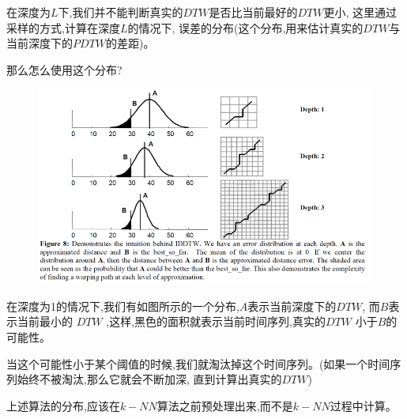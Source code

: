 \documentclass[UTF8,a4paper]{ctexart}
\newcommand{\spaceline}{\vspace{\baselineskip}}
\begin{document}
  在深度为$L$下,我们并不能判断真实的$DTW$是否比当前最好的$DTW$更小,
  这里通过采样的方式,计算在深度$L$的情况下,
  误差的分布(这个分布,用来估计真实的$DTW$与当前深度下的$PDTW$的差距)。

  \spaceline
  那么怎么使用这个分布?

  \begin{figure}[H]
    \centering
    \includegraphics[width = \textwidth]{assets/DynamicTimeWarping(DTW)_026a7.png}
  \end{figure}

  在深度为1的情况下,我们有如图所示的一个分布,$A$表示当前深度下的$DTW$,
  而$B$表示当前最小的 $DTW$ ,这样,黑色的面积就表示当前时间序列,真实的$DTW$
  小于$B$的可能性。

  当这个可能性小于某个阈值的时候,我们就淘汰掉这个时间序列。(如果一个时间序列始终不被淘汰,那么它就会不断加深,
  直到计算出真实的$DTW$)

  上述算法的分布,应该在$k-NN$算法之前预处理出来,而不是$k-NN$过程中计算。
\end{document}
